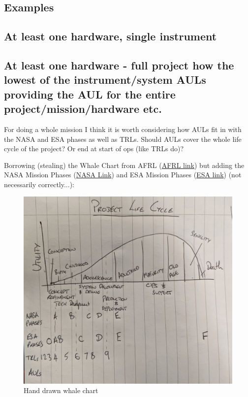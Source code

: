 \documentclass[referee,a4paper,12pt,traditabstract]{swsc}
\begin{document}
\begin{linenumbers}
\section{Examples}
\subsection{At least one hardware, single instrument}

\subsection{At least one hardware - full project how the lowest of the instrument/system AULs providing the AUL for the entire project/mission/hardware etc.}

For doing a whole mission I think it is worth considering how AULs fit in with the NASA and ESA phases as well as TRLs. Should AULs cover the whole life cycle of the project? Or end at start of ops (like TRLs do)?

Borrowing (stealing) the Whale Chart from AFRL (\href{https://smartech.gatech.edu/bitstream/handle/1853/8034/SSEC_SD5_ppt.pdf}{AFRL link}) but adding the NASA Mission Phases (\href{https://solarsystem.nasa.gov/basics/chapter7-1)}{NASA Link}) and ESA Mission Phases (\href{(https://www.space.irfu.se/seminars/20180523-Cripps-HW_Project.pdf}{ESA link}) (not necessarily correctly...):

\begin{figure}[h!t]
    \centering
    \includegraphics[scale=0.1]{whaleChart_hand.jpg}
    \caption{Hand drawn whale chart}
    \label{fig:whaleChart}
\end{figure}


\end{linenumbers}
\end{document}
